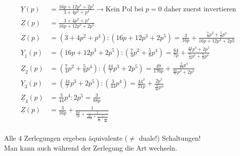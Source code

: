 \begin{align}
	\underline{Y}(p)&=\frac{16p+12p^3+2p^5}{3+4p^2+p^4}\rightarrow\text{Kein
	Pol bei }p=0\text{ daher zuerst invertieren}\nonumber\\
	\underline{Z}(p)&=\frac{3+4p^2+p^4}{16p+12p^3+2p^5}\nonumber\\
	\underline{Z}(p)&=\left(3+4p^2+p^4\right):\left(16p+12p^3+2p^5\right)=\frac{3}{16p}+\frac{\frac{7}{4}p^2+\frac{5}{8}p^4}{16p+12p^3+2p5}\nonumber\\
	\underline{Y}_1(p)&=\left(16p+12p^3+2p^5\right):\left(\frac{7}{4}p^2+\frac{5}{8}p^4\right)=\frac{64}{7p}+\frac{\frac{44}{7}p^3+2p^5}{\frac{7}{4}p^2+\frac{5}{8}p^4}\nonumber\\
	\underline{Z}_2(p)&=\left(\frac{7}{4}p^2+\frac{5}{8}p^4\right):\left(\frac{44}{7}p^3+2p^5\right)=\frac{49}{176p}+\frac{\frac{3}{44}p^4}{\frac{44}{7}p^3+2p^5}\nonumber\\
	\underline{Y}_3(p)&=\left(\frac{44}{7}p^3+2p^5\right):\left(\frac{3}{44}p^4\right)=\frac{44^2}{21p}+\frac{2p^5}{\frac{3}{44}p^4}\nonumber\\
	\underline{Z}_4(p)&=\frac{3}{44}p^4:2p^5=\frac{3}{88p}\nonumber\\
	\underline{Z}(p)&=\frac{3}{16p}+\frac{1}{\frac{64}{7p}+\frac{1}{\frac{49}{176p}+\frac{1}{\frac{44^2}{21p}+\frac{1}{\frac{3}{88p}}}}}\nonumber
\end{align}
\\
Alle 4 Zerlegungen ergeben äquivalente ($\neq$ duale!) Schaltungen!\\
Man kann auch während der Zerlegung die Art wechseln.\\